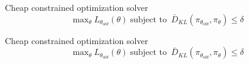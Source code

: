 \documentclass{beamer}
\begin{document}
    

\begin{frame}{Cheap constrained optimization solver}
\begingroup 
\Large
\begin{equation*}
    \text{max}_{\theta} \hspace{3pt} L_{\theta_{old}}(\theta) \hspace{3pt} 
    \text{subject to }  \hspace{2pt} \bar{D}_{KL}\left(\pi_{\theta_{old}}, \pi_\theta \right) \leq \delta
\end{equation*}
\endgroup

\end{frame}

\begin{frame}{Cheap constrained optimization solver}
    \begin{equation*}
        \text{max}_{\theta} \hspace{3pt} L_{\theta_{old}}(\theta) \hspace{3pt} 
        \text{subject to }  \hspace{2pt} \bar{D}_{KL}\left(\pi_{\theta_{old}}, \pi_\theta \right) \leq \delta
    \end{equation*}
\end{frame}
\end{document}
